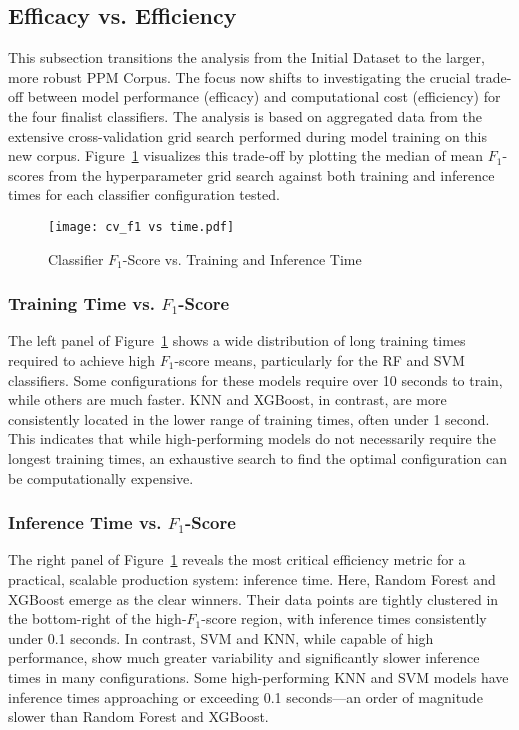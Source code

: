 \subsection{Efficacy vs. Efficiency}
This subsection transitions the analysis from the Initial Dataset to the larger, more robust PPM Corpus. The focus now shifts to investigating the crucial trade-off between model performance (efficacy) and computational cost (efficiency) for the four finalist classifiers. The analysis is based on aggregated data from the extensive cross-validation grid search performed during model training on this new corpus. Figure~\ref{fig:f1time} visualizes this trade-off by plotting the median of mean \(F_1\)-scores from the hyperparameter grid search against both training and inference times for each classifier configuration tested.
\begin{figure}[tb]
    \captionsetup{skip=5pt}
    \centering
    \texttt{[image: cv\_f1 vs time.pdf]}
    \caption{Classifier \(F_1\)-Score vs. Training and Inference Time}
    \label{fig:f1time}
\end{figure}

\subsubsection{Training Time vs. \(F_1\)-Score}
The left panel of Figure~\ref{fig:f1time} shows a wide distribution of long training times required to achieve high \(F_1\)-score means, particularly for the RF and SVM classifiers. Some configurations for these models require over 10 seconds to train, while others are much faster. KNN and XGBoost, in contrast, are more consistently located in the lower range of training times, often under 1 second. This indicates that while high-performing models do not necessarily require the longest training times, an exhaustive search to find the optimal configuration can be computationally expensive.

\subsubsection{Inference Time vs. \(F_1\)-Score}
The right panel of Figure~\ref{fig:f1time} reveals the most critical efficiency metric for a practical, scalable production system: inference time. Here, Random Forest and XGBoost emerge as the clear winners. Their data points are tightly clustered in the bottom-right of the high-\(F_1\)-score region, with inference times consistently under 0.1 seconds. In contrast, SVM and KNN, while capable of high performance, show much greater variability and significantly slower inference times in many configurations. Some high-performing KNN and SVM models have inference times approaching or exceeding 0.1 seconds—an order of magnitude slower than Random Forest and XGBoost.

